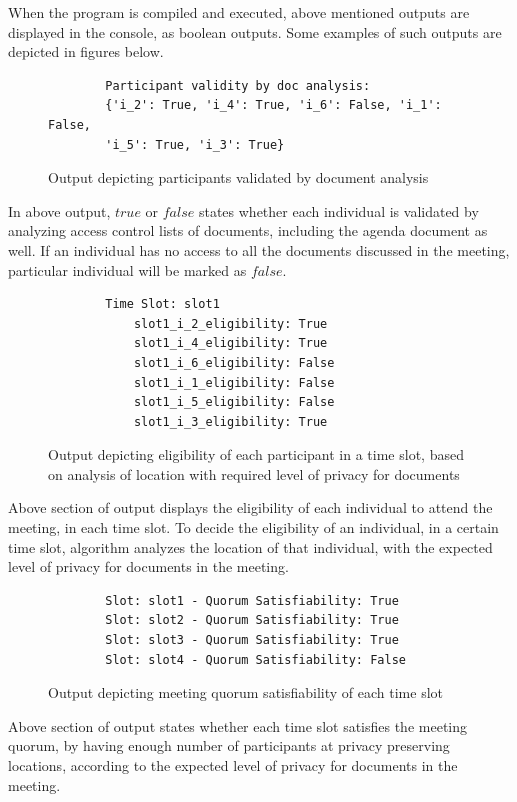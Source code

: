 When the program is compiled and executed, above mentioned outputs are displayed in the console, as boolean outputs. Some examples of such outputs are depicted in figures below.\\ 
\begin{figure}[H]  
    \centering
    \begin{verbatim}
        Participant validity by doc analysis:
        {'i_2': True, 'i_4': True, 'i_6': False, 'i_1': False, 
        'i_5': True, 'i_3': True}
    \end{verbatim}
    \caption{Output depicting participants validated by document analysis}
    \label{fig:output depicting participants validated by document analysis}
\end{figure} 
In above output, $true$ or $false$ states whether each individual is validated by analyzing access control lists of documents, including the agenda document as well. If an individual has no access to all the documents discussed in the meeting, particular individual will be marked as $false$.\\ 

\begin{figure}[H]  
    \centering
    \begin{verbatim}
        Time Slot: slot1
            slot1_i_2_eligibility: True
            slot1_i_4_eligibility: True
            slot1_i_6_eligibility: False
            slot1_i_1_eligibility: False
            slot1_i_5_eligibility: False
            slot1_i_3_eligibility: True
    \end{verbatim}
    \caption{Output depicting eligibility of each participant in a time slot, based on analysis of location with required level of privacy for documents}
    \label{fig:output depicting eligibility of each participant in a time slot, based on analysis of location with required level of privacy for documents}
\end{figure} 
Above section of output displays the eligibility of each individual to attend the meeting, in each time slot. To decide the eligibility of an individual, in a certain time slot, algorithm analyzes the location of that individual, with the expected level of privacy for documents in the meeting.\\ 

\begin{figure}[H]  
    \centering
    \begin{verbatim}
        Slot: slot1 - Quorum Satisfiability: True
        Slot: slot2 - Quorum Satisfiability: True
        Slot: slot3 - Quorum Satisfiability: True
        Slot: slot4 - Quorum Satisfiability: False
    \end{verbatim}
    \caption{Output depicting meeting quorum satisfiability of each time slot}
    \label{fig:output depicting meeting quorum satisfiability of each time slot}
\end{figure} 
Above section of output states whether each time slot satisfies the meeting quorum, by having enough number of participants at privacy preserving locations, according to the expected level of privacy for documents in the meeting.\\ 

